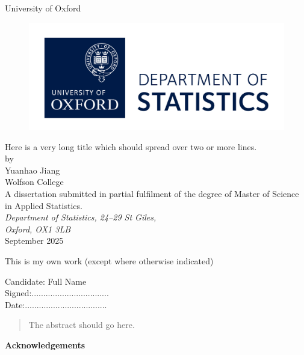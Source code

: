 \documentclass[a4paper,12pt]{article}
\begin{document}

\begin{titlepage}
\begin{center}
\vspace{1cm}
\textsf{\Huge{University of Oxford \\}}
\vspace{1cm}
\begin{figure}[htb]
\centering
\includegraphics[scale=.8]{stats_logo_RGB.jpg}
\end{figure}
\vspace{2.0cm}
\Huge{Here is a very long title which should spread over two or more lines.\\}
\vspace{2.0cm}
\large{ by \\[14pt] Yuanhao Jiang \\[8pt] Wolfson College} \\
\vspace{2.2cm}
\large{A dissertation submitted in partial fulfilment of the degree of Master of Science in Applied Statistics.
} \\
\vspace{.5cm}
\large{\emph{Department of Statistics, 24--29 St Giles, \\Oxford, OX1 3LB}} \\
\vspace{1.0cm}
\large{September 2025} \\
\end{center}
\end{titlepage}
\clearpage

This is my own work (except where otherwise indicated)
\vspace{2.5in}

\begin{center}
Candidate: Full Name\\
\vspace{1.0in}
Signed:.................................\\
\vspace{1.0in}
Date:...................................
\end{center}
\clearpage
\begin{abstract}

The abstract should go here.

\end{abstract}
\clearpage
\vspace*{2in}
\begin{center}
\textbf{Acknowledgements}
\end{center}
\end{document}
